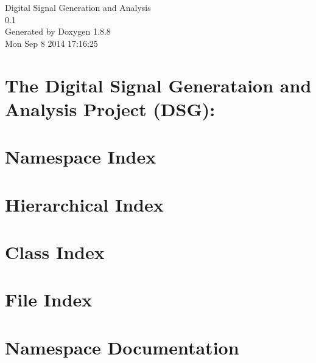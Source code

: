 \documentclass[twoside]{book}
\newcommand{\+}{\discretionary{\mbox{\scriptsize$\hookleftarrow$}}{}{}}
\newcommand{\clearemptydoublepage}{%
  \newpage{\pagestyle{empty}\cleardoublepage}%
}
\begin{document}
\hypersetup{pageanchor=false,
             bookmarks=true,
             bookmarksnumbered=true,
             pdfencoding=unicode
            }
\begin{titlepage}
\vspace*{7cm}
\begin{center}%
{\Large Digital Signal Generation and Analysis \\[1ex]\large 0.\+1 }\\
\vspace*{1cm}
{\large Generated by Doxygen 1.8.8}\\
\vspace*{0.5cm}
{\small Mon Sep 8 2014 17:16:25}\\
\end{center}
\end{titlepage}
\clearemptydoublepage
\tableofcontents
\clearemptydoublepage
{}
\hypersetup{pageanchor=true}

\chapter{The Digital Signal Generataion and Analysis Project (D\+S\+G)\+:}
\label{index}\hypertarget{index}{}
\chapter{Namespace Index}

\chapter{Hierarchical Index}

\chapter{Class Index}

\chapter{File Index}

\chapter{Namespace Documentation}









\end{document}
